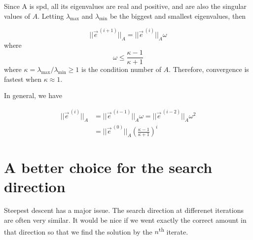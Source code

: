 Since A is spd, all its eigenvalues are real and positive, and are also the singular values of $A$. Letting $\lambda_{\max}$ and $\lambda_{\min}$ be the biggest and smallest eigenvalues, then

\begin{equation*}
    \lvert\lvert \vec{e}^{\,(i+1)} \rvert\rvert_A
    =\lvert\lvert \vec{e}^{\,(i)} \rvert\rvert_A\omega
\end{equation*}
where
\begin{equation*}
    \omega \leq \frac{\kappa - 1}{\kappa+1}
\end{equation*}
where $\kappa = \lambda_{\max}/\lambda_{\min} \geq 1$ is the condition number of $A$. Therefore, convergence is fastest when $\kappa\approx 1$.



In general, we have

\begin{align*}
    || \vec{e}^{\,(i)} ||_A &= || \vec{e}^{\,(i-1)} ||_A\omega = || \vec{e}^{\,(i-2)} ||_A\omega^2\\
    &= || \vec{e}^{\,(0)} ||_A \left(\frac{\kappa-1}{\kappa+1}\right)^i
\end{align*}

\section*{A better choice for the search direction}

Steepest descent has a major issue. The search direction at differenet iterations are often very similar. It would be nice if we went exactly the correct amount in that direction so that we find the solution by the $n$\textsuperscript{th} iterate.


